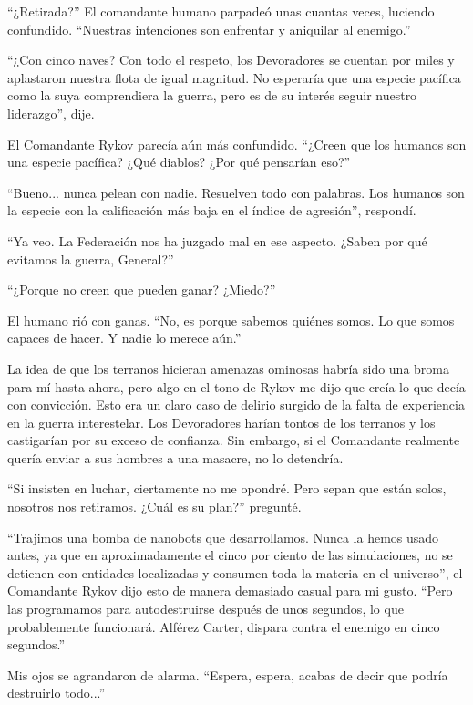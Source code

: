 \documentclass[spanish,12pt,a4paper,oneside,titlepage]{book}
\begin{document}
    ``¿Retirada?'' El comandante humano parpadeó unas cuantas veces, luciendo confundido. ``Nuestras intenciones son enfrentar y aniquilar al enemigo.''

    ``¿Con cinco naves? Con todo el respeto, los Devoradores se cuentan por miles y aplastaron nuestra flota de igual magnitud. No esperaría que una especie pacífica como la suya comprendiera la guerra, pero es de su interés seguir nuestro liderazgo'', dije.

    El Comandante Rykov parecía aún más confundido. ``¿Creen que los humanos son una especie pacífica? ¿Qué diablos? ¿Por qué pensarían eso?''

    ``Bueno... nunca pelean con nadie. Resuelven todo con palabras. Los humanos son la especie con la calificación más baja en el índice de agresión'', respondí.

    ``Ya veo. La Federación nos ha juzgado mal en ese aspecto. ¿Saben por qué evitamos la guerra, General?''

    ``¿Porque no creen que pueden ganar? ¿Miedo?''

    El humano rió con ganas. ``No, es porque sabemos quiénes somos. Lo que somos capaces de hacer. Y nadie lo merece aún.''

    La idea de que los terranos hicieran amenazas ominosas habría sido una broma para mí hasta ahora, pero algo en el tono de Rykov me dijo que creía lo que decía con convicción. Esto era un claro caso de delirio surgido de la falta de experiencia en la guerra interestelar. Los Devoradores harían tontos de los terranos y los castigarían por su exceso de confianza. Sin embargo, si el Comandante realmente quería enviar a sus hombres a una masacre, no lo detendría.

    ``Si insisten en luchar, ciertamente no me opondré. Pero sepan que están solos, nosotros nos retiramos. ¿Cuál es su plan?'' pregunté.

    ``Trajimos una bomba de nanobots que desarrollamos. Nunca la hemos usado antes, ya que en aproximadamente el cinco por ciento de las simulaciones, no se detienen con entidades localizadas y consumen toda la materia en el universo'', el Comandante Rykov dijo esto de manera demasiado casual para mi gusto. ``Pero las programamos para autodestruirse después de unos segundos, lo que probablemente funcionará. Alférez Carter, dispara contra el enemigo en cinco segundos.''

    Mis ojos se agrandaron de alarma. ``Espera, espera, acabas de decir que podría destruirlo todo...''
\end{document}
